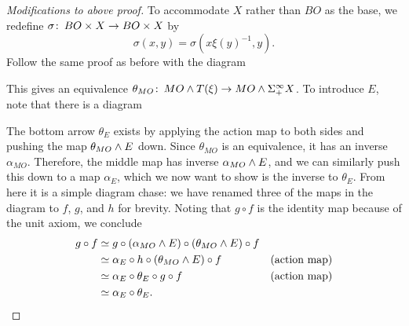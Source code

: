 \begin{proof}[Modifications to above proof]
To accommodate $X$ rather than $BO$ as the base, we redefine $\sigma\colon\thinspace BO \times X \to BO \times X$ by \[\sigma(x, y) = \sigma(x \xi(y)^{-1}, y).\]  Follow the same proof as before with the diagram
\begin{center}
\end{center}
This gives an equivalence $\theta_{MO}\colon\thinspace MO \wedge T(\xi) \rightarrow MO \wedge \Sigma^\infty_+ X$.  To introduce $E$, note that there is a diagram
\begin{center}
\end{center}
The bottom arrow $\theta_E$ exists by applying the action map to both sides and pushing the map $\theta_{MO} \wedge E$ down.  Since $\theta_{MO}$ is an equivalence, it has an inverse $\alpha_{MO}$.  Therefore, the middle map has inverse $\alpha_{MO} \wedge E$, and we can similarly push this down to a map $\alpha_E$, which we now want to show is the inverse to $\theta_E$.  From here it is a simple diagram chase: we have renamed three of the maps in the diagram to $f$, $g$, and $h$ for brevity.  Noting that $g \circ f$ is the identity map because of the unit axiom, we conclude
\begin{align*}
g\circ f &\simeq g \circ (\alpha_{MO}\sm E) \circ (\theta_{MO} \sm E) \circ f& \\
& \simeq \alpha_E \circ h \circ (\theta_{MO}\sm E) \circ f & \text{(action map)}\\
& \simeq \alpha_E \circ \theta_E \circ g \circ f & \text{(action map)}\\
&\simeq \alpha_E \circ \theta_E. & \qed
\end{align*}
\end{proof}

